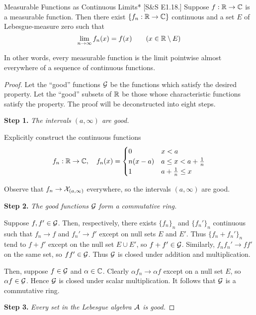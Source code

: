 \begin{problem}{Measurable Functions as Continuous Limits}*
    [S\&S E1.18.] Suppose $f : \mathbb{R} \to \mathbb{C}$ is a measurable function. Then there exist $\{f_n : \mathbb{R} \to \mathbb{C}\}$ continuous and a set $E$ of Lebesgue-measure zero such that 
    $$
    \lim_{n \to \infty} f_n(x) = f(x) \qquad (x \in \mathbb{R} \setminus E)
    $$

    In other words, every measurable function is the limit pointwise almost everywhere of a sequence of continuous functions. 
\end{problem}

\begin{proof}
    Let the ``good'' functions $\mathcal{G}$ be the functions which satisfy the desired property. Let the ``good'' subsets of $\mathbb{R}$ be those whose characteristic functions satisfy the property. The proof will be deconstructed into eight steps. 

    \textbf{Step 1.} \textit{The intervals $(a, \infty)$ are good.}

    Explicitly construct the continuous functions
    $$
    f_n : \mathbb{R} \to \mathbb{C}, \quad 
    f_n(x) = \begin{cases}
    0 & x < a \\
    n(x - a) & a \leq x < a + \frac{1}{n} \\
    1 & a + \frac{1}{n} \leq x
    \end{cases}
    $$

    Observe that $f_n \to \mathcal{X}_{(a, \infty)}$ everywhere, so the intervals $(a, \infty)$ are good. 

    \textbf{Step 2.} \textit{The good functions $\mathcal{G}$ form a commutative ring.}

    Suppose $f, f' \in \mathcal{G}$. Then, respectively, there exists $\{f_n\}_n$ and $\{f_n'\}_n$ continuous such that $f_n \to f$ and $f_n' \to f'$ except on null sets $E$ and $E'$. Thus $\{f_n + f_n'\}_n$ tend to $f+f'$ except on the null set $E \cup E'$, so $f + f' \in \mathcal{G}$. Similarly, $f_n f_n' \to ff'$ on the same set, so $f f' \in \mathcal{G}$. Thus $\mathcal{G}$ is closed under addition and multiplication.

    Then, suppose $f \in \mathcal{G}$ and $\alpha \in \mathbb{C}$. Clearly $\alpha f_n \to \alpha f$ except on a null set $E$, so $\alpha f \in \mathcal{G}$. Hence $\mathcal{G}$ is closed under scalar multiplication. It follows that $\mathcal{G}$ is a commutative ring. 

    \textbf{Step 3.} \textit{Every set in the Lebesgue algebra $\mathcal{A}$ is good.}


\end{proof}
